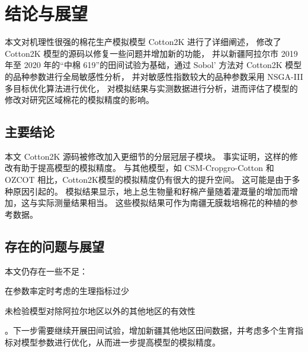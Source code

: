 \chapter{结论与展望}
本文对机理性很强的棉花生产模拟模型 Cotton2K 进行了详细阐述，%
修改了 Cotton2K 模型的源码以修复一些问题并增加新的功能，%
并以新疆阿拉尔市 2019年至 2020 年的“中棉 619”的田间试验为基础，通过 Sobol' 方法对 Cotton2K 模型的品种参数进行全局敏感性分析，%
并对敏感性指数较大的品种参数采用 NSGA-III 多目标优化算法进行优化，%
对模拟结果与实测数据进行分析，进而评估了模型的修改对研究区域棉花的模拟精度的影响。

\section{主要结论}

本文 Cotton2K 源码被修改加入更细节的分层冠层子模块。%
事实证明，这样的修改有助于提高模型的模拟精度。
与其他模型，如 CSM-Cropgro-Cotton 和 OZCOT 相比，Cotton2K模型的模拟精度仍有很大的提升空间。%
这可能是由于多种原因引起的。%
模拟结果显示，地上总生物量和籽棉产量随着灌溉量的增加而增加，这与实际测量结果相当。%
这些模拟结果可作为南疆无膜栽培棉花的种植的参考数据。

\section{存在的问题与展望}

本文仍存在一些不足：
\begin{enumerate*}
    \item 在参数率定时考虑的生理指标过少
    \item 未检验模型对除阿拉尔地区以外的其他地区的有效性
\end{enumerate*}。下一步需要继续开展田间试验，增加新疆其他地区田间数据，并考虑多个生育指标对模型参数进行优化，从而进一步提高模型的模拟精度。